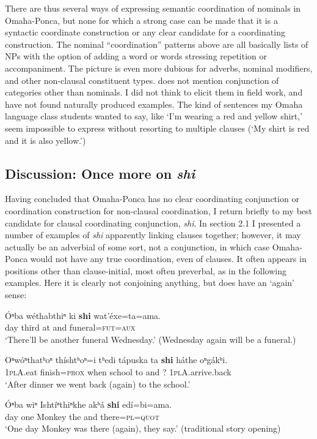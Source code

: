 \documentclass[output=paper]{LSP/langsci}
\begin{document}
There are thus several ways of expressing semantic coordination of nominals in Omaha-Ponca, but none for which a strong case can be made that it is a syntactic coordinate construction or any clear candidate for a coordinating construction. The nominal ``coordination'' patterns above are all basically lists of NPs with the option of adding a word or words stressing repetition or accompaniment. The picture is even more dubious for adverbs, nominal modifiers, and other non-clausal constituent types. \citet{Koontz1984} does not mention conjunction of categories other than nominals. I did not think to elicit them in field work, and have not found naturally produced examples.  The kind of sentences my Omaha language class students wanted to say, like `I'm wearing a red and yellow shirt,' seem impossible to express without resorting to multiple clauses (`My shirt is red and it is also yellow.')

\subsection{Discussion: Once more on \textit{shi}}

Having concluded that Omaha-Ponca has no clear coordinating conjunction or coordination construction for non-clausal coordination, I return briefly to my best candidate for clausal coordinating conjunction, \textit{shi}. In section 2.1 I presented a number of examples of \textit{shi} apparently linking clauses together; however, it may actually be an adverbial of some sort, not a conjunction, in which case Omaha-Ponca would not have any true coordination, even of clauses. It often appears in positions other than clause-initial, most often preverbal, as in the following examples. Here it is clearly not conjoining anything, but does have an `again' sense:  

\begin{exe}	
\ex
\gll \'Oⁿba 	w\'ethabthiⁿ 	ki 	\textbf{shi}  	wat'\'exe=ta=ama.  \\
day  	third          	at 	and 	funeral=\textsc{fut=aux}  \\
\trans `There'll be another funeral Wednesday.'   (Wednesday again will be a funeral.)

\ex 
\gll Oⁿw\'oⁿthatʰoⁿ th\'ishtʰoⁿ=i 	tʰedi 	t\'apuska 	ta 	\textbf{shi}  h\'athe 	oⁿg\'akʰi. \\
\textsc{1plA}.eat  	finish=\textsc{prox} 	when 	school 	to 	and ?  	\textsc{1plA}.arrive.back \\
\trans `After dinner we went back (again) to the school.'

\ex
\gll \'Oⁿba 	wiⁿ 	Isht\'iⁿthiⁿkhe 	akʰ\'a \textbf{shi} ed\'i=bi=ama. \\
day	one 	Monkey 	the 	and 	there=\textsc{pl=quot} \\
\trans `One day Monkey was there (again), they say.'  (traditional story opening)
\end{exe}
\end{document}
